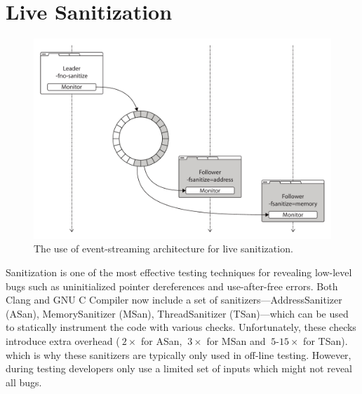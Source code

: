 



\section{Live Sanitization}
\label{sec:sanitization}

\begin{figure}[t]
  \begin{center}
    \includegraphics[width=0.75\columnwidth]{applications/figures/live-sanitization}
    \caption{The use of event-streaming architecture for live sanitization.}
    \label{fig:live-sanitization}
  \end{center}
\end{figure}

Sanitization is one of the most effective testing techniques for
revealing low-level bugs such as uninitialized pointer dereferences and
use-after-free errors.  Both Clang and GNU C Compiler now include a set
of sanitizers---AddressSanitizer (ASan), MemorySanitizer (MSan),
ThreadSanitizer (TSan)---which can be used to statically instrument
the code with various checks.  Unfortunately, these checks introduce
extra overhead (\eg $~2\times$ for ASan, $~3\times$ for MSan and
$~5$-$15\times$ for TSan).  which is why these sanitizers are typically
only used in off-line testing. However, during testing developers only
use a limited set of inputs which might not reveal all bugs.

